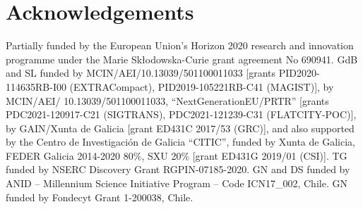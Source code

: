 \documentclass{elsarticle}
\begin{document}
\section*{Acknowledgements}

Partially funded by the European Union’s Horizon 2020 research and innovation programme under the Marie Sk{\l}odowska-Curie grant agreement No 690941. GdB and SL funded by  MCIN/AEI/10.13039/501100011033 [grants PID2020-114635RB-I00 (EXTRACompact), PID2019-105221RB-C41 (MAGIST)], by MCIN/AEI/ 10.13039/501100011033, ``NextGenerationEU/PRTR'' [grants PDC2021-120917-C21 (SIGTRANS), PDC2021-121239-C31 (FLATCITY-POC)], by GAIN/Xunta de Galicia [grant ED431C 2017/53 (GRC)], and also supported by the Centro de Investigación de Galicia ``CITIC'', funded by Xunta de Galicia, FEDER Galicia 2014-2020 80\%, SXU 20\% [grant ED431G 2019/01 (CSI)].  TG funded by NSERC Discovery Grant RGPIN-07185-2020.  GN and DS funded by ANID -- Millennium Science Initiative Program -- Code ICN17\_002, Chile. GN funded by Fondecyt Grant 1-200038, Chile.
\end{document}
